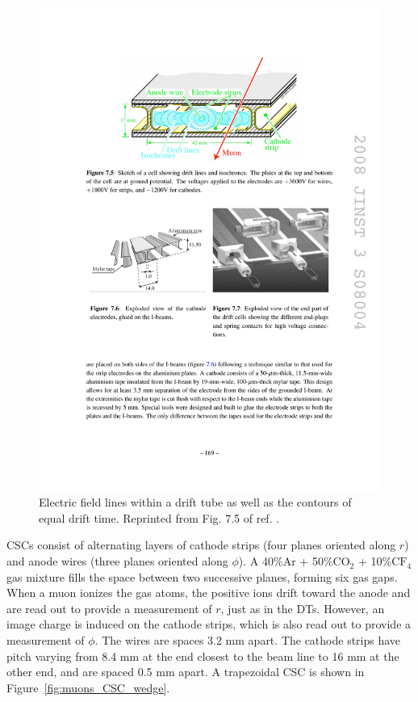 \documentclass[dissertation.tex]{subfiles}
\begin{document}
\begin{figure}
	\centering
	\includegraphics[scale=1.0]{muons_DT}
	\caption{Electric field lines within a drift tube as well as the contours of equal drift time.  Reprinted from Fig. 7.5 of ref. \cite{CMS_detector_paper}.}
	\label{fig:muons_DT}
\end{figure}

CSCs consist of alternating layers of cathode strips (four planes oriented along $r$) and anode wires (three planes oriented along $\phi$).  A 40\%Ar + 50\%$\mbox{CO}_{2}$ + 10\%$\mbox{CF}_{4}$ gas mixture fills the space between two successive planes, forming six gas gaps.  When a muon ionizes the gas atoms, the positive ions drift toward the anode and are read out to provide a measurement of $r$, just as in the DTs.  However, an image charge is induced on the cathode strips, which is also read out to provide a measurement of $\phi$.  The wires are spaces 3.2 mm apart.  The cathode strips have pitch varying from 8.4 mm at the end closest to the beam line to 16 mm at the other end, and are spaced 0.5 mm apart.  A trapezoidal CSC is shown in Figure~\ref{fig:muons_CSC_wedge}.
\end{document}
